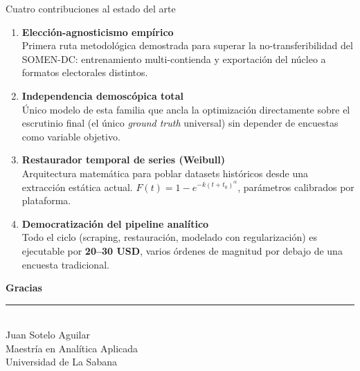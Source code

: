 \begin{frame}{Cuatro contribuciones al estado del arte}
  \begin{enumerate}
    \item \textbf{Elección-agnosticismo empírico}\\
          Primera ruta metodológica demostrada para superar la no-transferibilidad
          del SOMEN-DC: entrenamiento multi-contienda y exportación del núcleo
          a formatos electorales distintos.

    \vspace{0.4em}
    \item \textbf{Independencia demoscópica total}\\
          Único modelo de esta familia que ancla la optimización directamente
          sobre el escrutinio final (el único \textit{ground truth} universal)
          sin depender de encuestas como variable objetivo.

    \vspace{0.4em}
    \item \textbf{Restaurador temporal de series (Weibull)}\\
          Arquitectura matemática para poblar datasets históricos desde una
          extracción estática actual.
          $F(t) = 1 - e^{-k(t+t_0)^{\alpha}}$, parámetros calibrados por plataforma.

    \vspace{0.4em}
    \item \textbf{Democratización del pipeline analítico}\\
          Todo el ciclo (scraping, restauración, modelado con regularización)
          es ejecutable por \textbf{20--30 USD}, varios órdenes de magnitud
          por debajo de una encuesta tradicional.
  \end{enumerate}
\end{frame}

\addtocounter{framenumber}{1}

\addtocounter{framenumber}{1}

{
\begin{frame}[plain]
  \vspace{2.0cm}
  \begin{center}
    {\color{barBlue}\Large\bfseries Gracias}\\[0.5em]
    {\color{barBlue}\rule{0.6\textwidth}{1pt}}\\[0.7em]
    {\color{darkText}\normalsize Juan Sotelo Aguilar}\\[0.2em]
    {\color{subtleGray}\small Maestría en Analítica Aplicada}\\[0.15em]
    {\color{subtleGray}\small Universidad de La Sabana}
  \end{center}
\end{frame}
}
